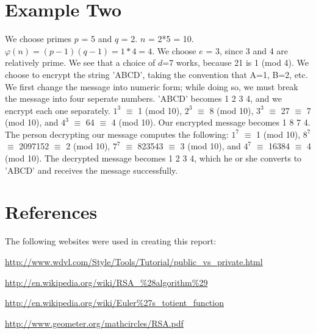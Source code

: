 \documentclass[12pt]{article}
\begin{document}
\section{Example Two}
We choose primes $p$ = 5 and $q$ = 2. $n$ = 2*5 = 10. $\varphi(n)=(p-1)(q-1)=1*4 = 4$. We choose $e$ = 3, since 3 and 4 are relatively prime. We see that a choice of $d$=7 works, because 21 is 1 (mod 4). We choose to encrypt the string 'ABCD', taking the convention that A=1, B=2, etc. We first change the message into numeric form; while doing so, we must break the message into four seperate numbers. 'ABCD' becomes 1 2 3 4, and we encrypt each one separately. $1^3$ $\equiv$ 1 (mod 10), $2^3$ $\equiv$ 8 (mod 10), $3^3$ $\equiv$ 27 $\equiv$ 7 (mod 10), and $4^3$ $\equiv$ 64 $\equiv$ 4 (mod 10). Our encrypted message becomes 1 8 7 4. The person decrypting our message computes the following: $1^7$ $\equiv$ 1 (mod 10), $8^7$ $\equiv$ 2097152 $\equiv$ 2 (mod 10), $7^7$ $\equiv$ 823543 $\equiv$ 3 (mod 10), and $4^7$ $\equiv$ 16384 $\equiv$ 4 (mod 10). The decrypted message becomes 1 2 3 4, which he or she converts to 'ABCD' and receives the message successfully.



\section{References}
The following websites were used in creating this report:

\url{http://www.wdvl.com/Style/Tools/Tutorial/public_vs_private.html}

\url{http://en.wikipedia.org/wiki/RSA_%28algorithm%29}

\url{http://en.wikipedia.org/wiki/Euler%27s_totient_function}

\url{http://www.geometer.org/mathcircles/RSA.pdf}
\end{document}
